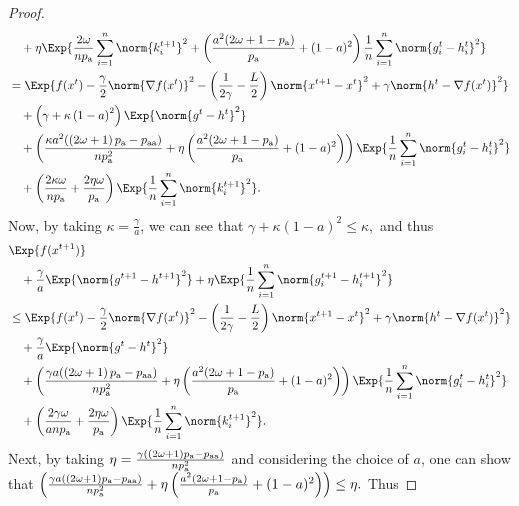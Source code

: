 \documentclass{article}
\newcommand*{\probavailable}{\ensuremath{p_{\textnormal{a}}}}
\newcommand*{\probpairaa}{\ensuremath{p_{\textnormal{aa}}}}
\begin{document}
\begin{proof}
\begin{align*}
      &\quad +\eta \Exp{\frac{2 \omega}{n \probavailable} \sum_{i=1}^n \norm{k^{t+1}_i}^2 + \left(\frac{a^2(2\omega + 1 - \probavailable)}{\probavailable} + (1 - a)^2\right)\frac{1}{n}\sum_{i=1}^n\norm{g^{t}_i - h^{t}_i}^2} \\
      &= \Exp{f(x^t) - \frac{\gamma}{2}\norm{\nabla f(x^t)}^2 - \left(\frac{1}{2\gamma} - \frac{L}{2}\right)
      \norm{x^{t+1} - x^t}^2 + \gamma \norm{h^{t} - \nabla f(x^t)}^2}\nonumber\\
      &\quad + \left(\gamma + \kappa \left(1 - a\right)^2\right)\Exp{\norm{g^{t} - h^t}^2}\nonumber\\
      &\quad + \left(\frac{\kappa a^2 (\left(2 \omega + 1\right)\probavailable - \probpairaa)}{n \probavailable^2} + \eta\left(\frac{a^2(2\omega + 1 - \probavailable)}{\probavailable} + (1 - a)^2\right)\right)\Exp{\frac{1}{n} \sum_{i=1}^n\norm{g^t_i - h^{t}_i}^2}\nonumber\\
      &\quad + \left(\frac{2 \kappa \omega}{n \probavailable} + \frac{2 \eta \omega}{\probavailable}\right)\Exp{\frac{1}{n} \sum_{i=1}^n\norm{k^{t+1}_i}^2}.
  \end{align*}
  Now, by taking $\kappa = \frac{\gamma}{a}$, we can see that $\gamma + \kappa \left(1 - a\right)^2 \leq \kappa, $ and thus
  \begin{align*}
      &\Exp{f(x^{t + 1})} \\
      &\quad  + \frac{\gamma}{a} \Exp{\norm{g^{t+1} - h^{t+1}}^2} + \eta \Exp{\frac{1}{n}\sum_{i=1}^n\norm{g^{t+1}_i - h^{t+1}_i}^2}\\
      &\leq \Exp{f(x^t) - \frac{\gamma}{2}\norm{\nabla f(x^t)}^2 - \left(\frac{1}{2\gamma} - \frac{L}{2}\right)
      \norm{x^{t+1} - x^t}^2 + \gamma \norm{h^{t} - \nabla f(x^t)}^2}\nonumber\\
      &\quad + \frac{\gamma}{a}\Exp{\norm{g^{t} - h^t}^2}\nonumber\\
      &\quad + \left(\frac{\gamma a (\left(2 \omega + 1\right)\probavailable - \probpairaa)}{n \probavailable^2} + \eta\left(\frac{a^2(2\omega + 1 - \probavailable)}{\probavailable} + (1 - a)^2\right)\right)\Exp{\frac{1}{n} \sum_{i=1}^n\norm{g^t_i - h^{t}_i}^2}\nonumber\\
      &\quad + \left(\frac{2 \gamma \omega}{a n \probavailable} + \frac{2 \eta \omega}{\probavailable}\right)\Exp{\frac{1}{n} \sum_{i=1}^n\norm{k^{t+1}_i}^2}.
  \end{align*}
  Next, by taking $\eta = \frac{\gamma (\left(2 \omega + 1\right)\probavailable - \probpairaa)}{n \probavailable^2}$ and considering the choice of $a$, one can show that $\left(\frac{\gamma a (\left(2 \omega + 1\right)\probavailable - \probpairaa)}{n \probavailable^2} + \eta\left(\frac{a^2(2\omega + 1 - \probavailable)}{\probavailable} + (1 - a)^2\right)\right) \leq \eta.$ Thus


\end{proof}
\end{document}

